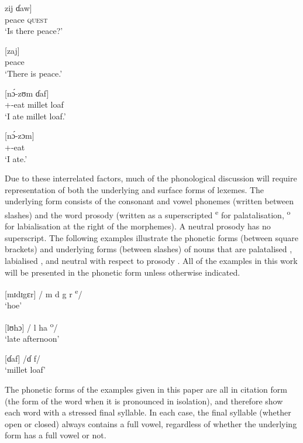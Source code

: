 \ea \label{ex:2:1}
\gll  {[}zij  ɗaw{]}\\
      peace  \textsc{quest}\\
\glt  ‘Is there peace?’ 
\z

\ea \label{ex:2:2}
\textup{[zaj]}\\
      peace\\
\glt  ‘There is peace.’ 
\z

\ea \label{ex:2:3}
\label{bkm:nozomdaf}\textup{[n\'{ɔ}-zʊm    ɗaf]}\\
      {\oneS}+{\PFV}-eat  {millet loaf}\\
\glt  ‘I ate millet loaf.’
\z

\ea \label{ex:2:4}
\textup{[n\'{ɔ}-zɔm}\textup{]}\\
      {\oneS}+{\PFV}-eat\\
\glt  ‘I ate.’
\z

Due to these interrelated factors, much of the phonological discussion will require representation of both the underlying and surface forms of lexemes. The underlying form  consists of the consonant and vowel phonemes (written between slashes) and the word prosody (written as a superscripted \textsuperscript{e} for palatalisation, \textsuperscript{o} for labialisation at the right of the morphemes). A neutral prosody has no superscript. The following examples illustrate the phonetic forms (between square brackets) and underlying forms (between slashes) of nouns that are palatalised , labialised , and neutral with respect to prosody . All of the examples in this work will be presented in the phonetic form unless otherwise indicated. 

\ea \label{ex:2:5}
\textup{[mɪdɪgɛr] \hspace{8pt} / m d g r \textsuperscript{e}}\textup{/}\\
\glt  ‘hoe’
\z

\ea \label{ex:2:6}
\textup{[lʊhɔ] \hspace{20pt}  / l ha \textsuperscript{o}}\textup{/}\\
\glt  ‘late afternoon’
\z

\ea \label{ex:2:7}
\textup{[ɗaf] \hspace{25pt} /ɗ f/}\\
\glt  ‘millet loaf’  
\z

The phonetic forms of the examples given in this paper are all in citation form (the form of the word when it is pronounced in isolation), and therefore show each word with a stressed final syllable.  In each case, the final syllable (whether open or closed) always contains a full vowel, regardless of whether the underlying form has a full vowel or not.  

